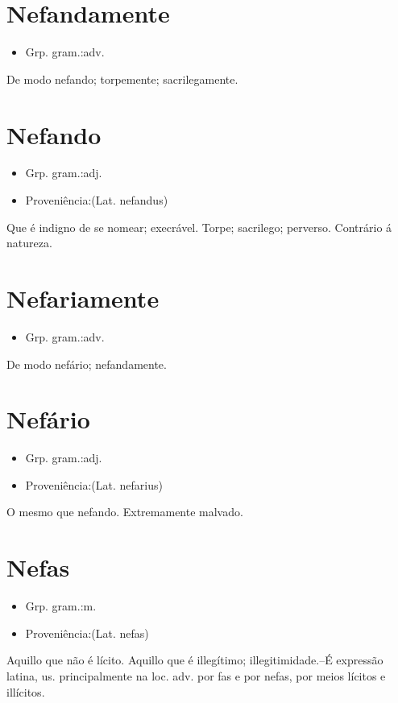 \section{Nefandamente}
\begin{itemize}
\item {Grp. gram.:adv.}
\end{itemize}
De modo nefando; torpemente; sacrilegamente.
\section{Nefando}
\begin{itemize}
\item {Grp. gram.:adj.}
\end{itemize}
\begin{itemize}
\item {Proveniência:(Lat. \textunderscore nefandus\textunderscore )}
\end{itemize}
Que é indigno de se nomear; execrável.
Torpe; sacrilego; perverso.
Contrário á natureza.
\section{Nefariamente}
\begin{itemize}
\item {Grp. gram.:adv.}
\end{itemize}
De modo nefário; nefandamente.
\section{Nefário}
\begin{itemize}
\item {Grp. gram.:adj.}
\end{itemize}
\begin{itemize}
\item {Proveniência:(Lat. \textunderscore nefarius\textunderscore )}
\end{itemize}
O mesmo que \textunderscore nefando\textunderscore .
Extremamente malvado.
\section{Nefas}
\begin{itemize}
\item {Grp. gram.:m.}
\end{itemize}
\begin{itemize}
\item {Proveniência:(Lat. \textunderscore nefas\textunderscore )}
\end{itemize}
Aquillo que não é lícito.
Aquillo que é illegítimo; illegitimidade.--É expressão latina, us. principalmente na loc. adv. \textunderscore por fas e por nefas\textunderscore , por meios lícitos e illícitos.
